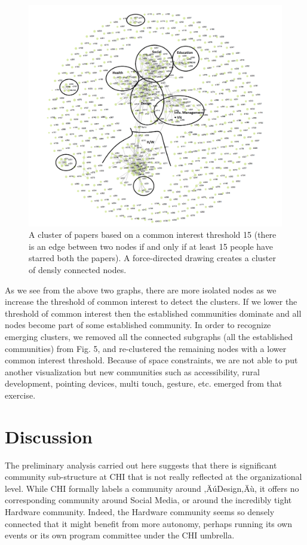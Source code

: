 \documentclass{sigchi}
\begin{document}
\begin{figure}[!h]
\centering
\includegraphics[width=0.9\columnwidth]{mychi-community-view-15}
\caption{A cluster of papers based on a common interest threshold 15 (there is an edge between two nodes if and only if at least 15 people have starred both the papers). A force-directed drawing creates a cluster of densly connected nodes. }
\label{Community View of threshold 15}
\end{figure}

As we see from the above two graphs, there are more isolated nodes as we increase the threshold of common interest to detect the clusters. If we lower the threshold of common interest then the established communities dominate and all nodes become part of some established community.  In order to recognize emerging clusters, we removed all the connected subgraphs (all the established communities) from Fig. 5, and re-clustered the remaining nodes with a lower common interest threshold. Because of space constraints, we are not able to put another visualization but new communities such as accessibility, rural development, pointing devices, multi touch, gesture, etc. emerged from that exercise.




\section{Discussion}
The preliminary analysis carried out here suggests that there is significant community sub-structure at CHI that is not really reflected at the organizational level.  While CHI formally labels a community around ‚ÄúDesign‚Äù, it offers no corresponding community around Social Media, or around the incredibly tight Hardware community.  Indeed, the Hardware community seems so densely connected that it might benefit from more autonomy, perhaps running its own events or its own program committee under the CHI umbrella.  
\end{document}
